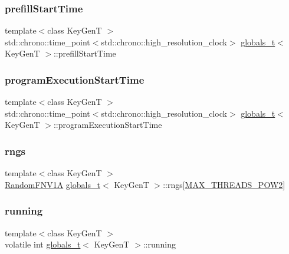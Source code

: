 \subsubsection{\texorpdfstring{prefill\+Start\+Time}{prefillStartTime}}
{\footnotesize\ttfamily template$<$class Key\+GenT $>$ \\
std\+::chrono\+::time\+\_\+point$<$std\+::chrono\+::high\+\_\+resolution\+\_\+clock$>$ \hyperlink{structglobals__t}{globals\+\_\+t}$<$ Key\+GenT $>$\+::prefill\+Start\+Time}

\mbox{\label{structglobals__t_a28d2a4525bd82f81cbca8236c3ba1ec7}} 
\subsubsection{\texorpdfstring{program\+Execution\+Start\+Time}{programExecutionStartTime}}
{\footnotesize\ttfamily template$<$class Key\+GenT $>$ \\
std\+::chrono\+::time\+\_\+point$<$std\+::chrono\+::high\+\_\+resolution\+\_\+clock$>$ \hyperlink{structglobals__t}{globals\+\_\+t}$<$ Key\+GenT $>$\+::program\+Execution\+Start\+Time}

\mbox{\label{structglobals__t_a4410c337060e0d0b9dd3821b2cbdf3c9}} 
\subsubsection{\texorpdfstring{rngs}{rngs}}
{\footnotesize\ttfamily template$<$class Key\+GenT $>$ \\
\hyperlink{classRandomFNV1A}{Random\+F\+N\+V1A} \hyperlink{structglobals__t}{globals\+\_\+t}$<$ Key\+GenT $>$\+::rngs\mbox{[}\hyperlink{plaf_8h_ac1585a3455dd3e33e877e588be9e466b}{M\+A\+X\+\_\+\+T\+H\+R\+E\+A\+D\+S\+\_\+\+P\+O\+W2}\mbox{]}}

\mbox{\label{structglobals__t_a8d2f88e1ba5301193c217fcd2bd4e7dd}} 
\subsubsection{\texorpdfstring{running}{running}}
{\footnotesize\ttfamily template$<$class Key\+GenT $>$ \\
volatile int \hyperlink{structglobals__t}{globals\+\_\+t}$<$ Key\+GenT $>$\+::running}

